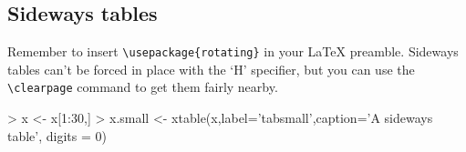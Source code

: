 \documentclass[letterpaper]{article}
\begin{document}
%
%
%

\subsection{Sideways tables}
Remember to insert \verb|\usepackage{rotating}| in your LaTeX preamble.
Sideways tables can't be forced in place with the `H' specifier, but you can
use the \verb|\clearpage| command to get them fairly nearby.

\begin{Schunk}
\begin{Sinput}
> x <- x[1:30,]
> x.small <- xtable(x,label='tabsmall',caption='A sideways table', digits = 0)
\end{Sinput}
\end{Schunk}
\end{document}
